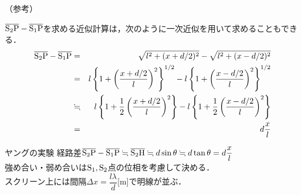 （参考）\hrulefill 

$ \overline{{\rm S_2P}} -\overline{{\rm S_1P}}$を求める近似計算は，次のように一次近似を用いて求めることもできる．
\begin{eqnarray*}
 \overline{{\rm S_2P}} -\overline{{\rm S_1P}} &=& \sqrt{l^2+(x+d/2)^2}-\sqrt{l^2+(x-d/2)^2}\\
 &=&l\left\{ 1+\left( \dfrac{x+d/2}{l} \right)^2 \right\}^{1/2}-l\left\{ 1+\left( \dfrac{x-d/2}{l} \right)^2 \right\}^{1/2}\\
 &\fallingdotseq& l\left\{ 1+\dfrac{1}{2} \left( \dfrac{x+d/2}{l} \right)^2 \right\}-l\left\{ 1+\dfrac{1}{2} \left( \dfrac{x-d/2}{l} \right)^2 \right\}\\
 &=&d\dfrac{x}{l}
\end{eqnarray*}

\hrulefill


 \begin{matome}{ヤングの実験}
 \hspace{3mm} 経路差$\overline{{\rm S_2P}} -\overline{{\rm S_1P}}\fallingdotseq \overline{{\rm S_2H}} \fallingdotseq d\sin \theta \fallingdotseq d\tan \theta =d\dfrac{x}{l}$\\
 強め合い・弱め合いは${\rm S_1,S_2}$点の位相を考慮して決める．\\
 スクリーン上には間隔$\Delta x=\dfrac{l\lambda}{d}$[m]で明線が並ぶ．
 \end{matome}

